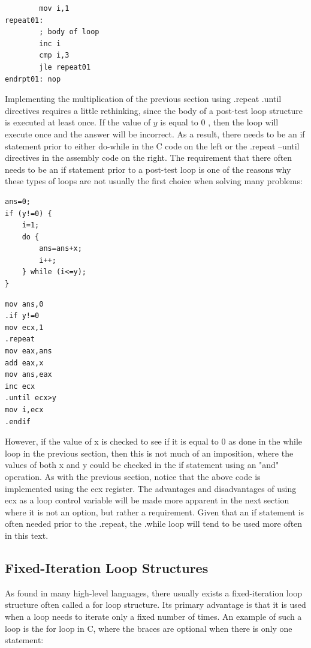 \documentclass[10pt]{article}
\begin{document}
\begin{verbatim}
        mov i,1
repeat01:
        ; body of loop
        inc i
        cmp i,3
        jle repeat01
endrpt01: nop
\end{verbatim}

Implementing the multiplication of the previous section using .repeat .until directives requires a little rethinking, since the body of a post-test loop structure is executed at least once. If the value of $y$ is equal to 0 , then the loop will execute once and the answer will be incorrect. As a result, there needs to be an if statement prior to either do-while in the C code on the left or the .repeat --until directives in the assembly code on the right. The requirement that there often needs to be an if statement prior to a post-test loop is one of the reasons why these types of loops are not usually the first choice when solving many problems:

\begin{verbatim}
ans=0;
if (y!=0) {
    i=1;
    do {
        ans=ans+x;
        i++;
    } while (i<=y);
}
\end{verbatim}

\begin{verbatim}
mov ans,0
.if y!=0
mov ecx,1
.repeat
mov eax,ans
add eax,x
mov ans,eax
inc ecx
.until ecx>y
mov i,ecx
.endif
\end{verbatim}

However, if the value of x is checked to see if it is equal to 0 as done in the while loop in the previous section, then this is not much of an imposition, where the values of both x and y could be checked in the if statement using an "and" operation. As with the previous section, notice that the above code is implemented using the ecx register. The advantages and disadvantages of using ecx as a loop control variable will be made more apparent in the next section where it is not an option, but rather a requirement. Given that an if statement is often needed prior to the .repeat, the .while loop will tend to be used more often in this text.

\subsection*{Fixed-Iteration Loop Structures}
As found in many high-level languages, there usually exists a fixed-iteration loop structure often called a for loop structure. Its primary advantage is that it is used when a loop needs to iterate only a fixed number of times. An example of such a loop is the for loop in C, where the braces are optional when there is only one statement:
\end{document}
